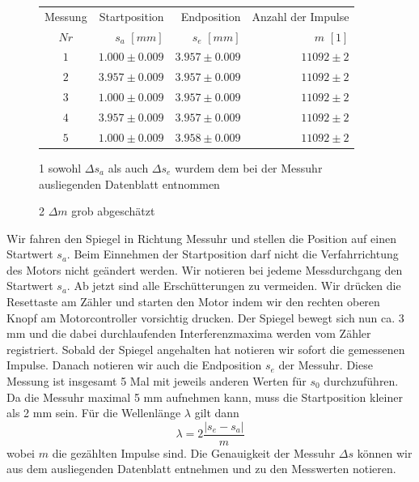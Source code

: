 \documentclass[a4paper,10pt]{article}
\begin{document}
\unboldmath
\begin{figure}
\centering
{}
\begin{threeparttable}
\begin{tabular}{crrr}
\toprule
Messung & Startposition & Endposition & Anzahl der Impulse \\
\(Nr\)&\boldmath\(s_a\) \unboldmath\([mm]\)&\boldmath\(s_e\) \unboldmath\([mm]\)&\boldmath\(m\) \unboldmath\([1]\)\\
\midrule
\(1\)&\(1.000\pm0.009\)&\(3.957\pm0.009\)&\(11092\pm2\)\\
\(2\)&\(3.957\pm0.009\)&\(3.957\pm0.009\)&\(11092\pm2\)\\
\(3\)&\(1.000\pm0.009\)&\(3.957\pm0.009\)&\(11092\pm2\)\\
\(4\)&\(3.957\pm0.009\)&\(3.957\pm0.009\)&\(11092\pm2\)\\
\(5\)&\(1.000\pm0.009\)&\(3.958\pm0.009\)&\(11092\pm2\)\\
  \bottomrule
 \end{tabular}
\begin{tablenotes}
\raggedright
\item[1]sowohl \boldmath\(\Delta s_a\) als auch \(\Delta s_e \) wurdem dem bei der Messuhr ausliegenden Datenblatt entnommen\unboldmath
\item[2] \boldmath\(\Delta m \) grob abgeschätzt\unboldmath
\end{tablenotes}
\end{threeparttable}

\label{tab:Tab1}
\end{figure}
\boldmath
Wir fahren den Spiegel in Richtung Messuhr
und stellen die Position auf einen Startwert \(s_a\). Beim Einnehmen
der Startposition darf nicht die Verfahrrichtung des Motors nicht geändert werden. Wir notieren bei jedeme Messdurchgang den Startwert \(s_a\). Ab jetzt sind
alle Erschütterungen zu vermeiden. Wir drücken die Resettaste am Zähler und starten den Motor indem wir den rechten oberen Knopf am Motorcontroller
vorsichtig drucken. Der Spiegel bewegt sich nun ca. 3 mm und die dabei durchlaufenden Interferenzmaxima werden vom Zähler registriert. Sobald
der Spiegel angehalten hat notieren wir sofort die gemessenen Impulse. Danach notieren wir auch die Endposition \(s_e\) der Messuhr.
Diese Messung ist insgesamt 5 Mal mit jeweils anderen Werten für \(s_0\) durchzuführen. Da die Messuhr maximal 5 mm aufnehmen kann, muss die Startposition kleiner als 2 mm sein. Für die Wellenlänge \(\lambda\) gilt dann
\begin{equation} \label{eq:lambda}
	\lambda = 2 \frac{|s_e - s_a |}{m}
\end{equation} 
wobei \(m\) die gezählten Impulse sind. Die Genauigkeit der Messuhr \(\Delta s\) können wir
aus dem ausliegenden Datenblatt entnehmen und zu den Messwerten notieren.
\end{document}
